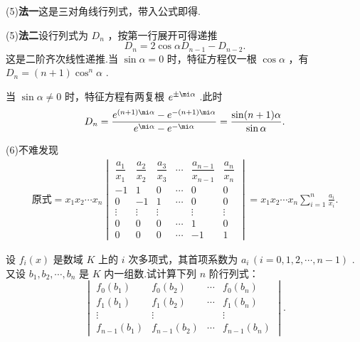 \begin{sol}
	(5){\bf 法一}\quad 这是三对角线行列式，带入公式即得.

	(5){\bf 法二}\quad 设行列式为 $D_n$ ，按第一行展开可得递推
	\[
		D_n=2\cos\alpha D_{n-1}-D_{n-2}.
	\]
	这是二阶齐次线性递推.当 $\sin\alpha=0$ 时，特征方程仅一根 $\cos\alpha$ ，有 $D_n=(n+1)\cos^n\alpha$ .

	当 $\sin\alpha\ne0$ 时，特征方程有两复根 $e^{\pm\mi\alpha}$ .此时
	\[
		D_n=\frac{e^{(n+1)\mi\alpha}-e^{-(n+1)\mi\alpha}}{e^{\mi\alpha}-e^{-\mi\alpha}}=\frac{\sin(n+1)\alpha}{\sin\alpha}.
	\]

	(6)不难发现
	\begin{align*}
		\text{原式}=x_1x_2\cdots x_n\begin{vmatrix}
			\dfrac{a_1}{x_1} & \dfrac{a_2}{x_2} & \dfrac{a_3}{x_3} & \cdots & \dfrac{a_{n-1}}{x_{n-1}} & \dfrac{a_n}{x_n} \\
			-1               & 1                & 0                & \cdots & 0                        & 0                \\
			0                & -1               & 1                & \cdots & 0                        & 0                \\
			\vdots           & \vdots           & \vdots           &        & \vdots                   & \vdots           \\
			0                & 0                & 0                & \cdots & 1                        & 0                \\
			0                & 0                & 0                & \cdots & -1                       & 1
		\end{vmatrix}=x_1x_2\cdots x_n\sum_{i=1}^{n}\frac{a_i}{x_i}.
	\end{align*}
\end{sol}
\begin{prob}[27]
	设 $f_i(x)$ 是数域 $K$ 上的 $i$ 次多项式，其首项系数为 $a_i\,(i=0,1,2,\cdots,n-1)$ .又设 $b_1,b_2,\cdots,b_n$ 是 $K$ 内一组数.试计算下列 $n$ 阶行列式：
	\[
		\begin{vmatrix}
			f_0(b_1)     & f_0(b_2)     & \cdots & f_0(b_n)     \\
			f_1(b_1)     & f_1(b_2)     & \cdots & f_1(b_n)     \\
			\vdots       & \vdots       &        & \vdots       \\
			f_{n-1}(b_1) & f_{n-1}(b_2) & \cdots & f_{n-1}(b_n)
		\end{vmatrix}.
	\]
\end{prob}
